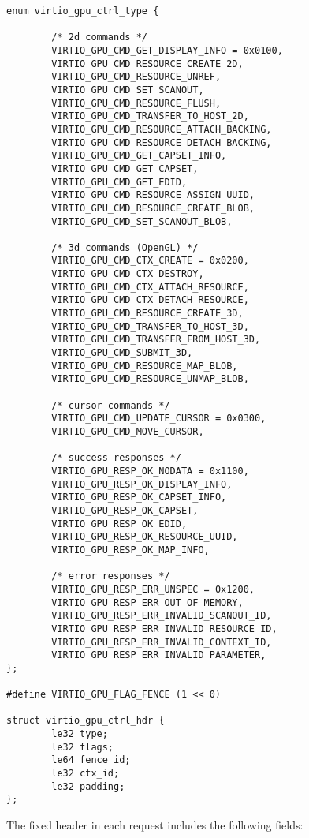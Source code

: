 \begin{lstlisting}
enum virtio_gpu_ctrl_type {

        /* 2d commands */
        VIRTIO_GPU_CMD_GET_DISPLAY_INFO = 0x0100,
        VIRTIO_GPU_CMD_RESOURCE_CREATE_2D,
        VIRTIO_GPU_CMD_RESOURCE_UNREF,
        VIRTIO_GPU_CMD_SET_SCANOUT,
        VIRTIO_GPU_CMD_RESOURCE_FLUSH,
        VIRTIO_GPU_CMD_TRANSFER_TO_HOST_2D,
        VIRTIO_GPU_CMD_RESOURCE_ATTACH_BACKING,
        VIRTIO_GPU_CMD_RESOURCE_DETACH_BACKING,
        VIRTIO_GPU_CMD_GET_CAPSET_INFO,
        VIRTIO_GPU_CMD_GET_CAPSET,
        VIRTIO_GPU_CMD_GET_EDID,
        VIRTIO_GPU_CMD_RESOURCE_ASSIGN_UUID,
        VIRTIO_GPU_CMD_RESOURCE_CREATE_BLOB,
        VIRTIO_GPU_CMD_SET_SCANOUT_BLOB,

        /* 3d commands (OpenGL) */
        VIRTIO_GPU_CMD_CTX_CREATE = 0x0200,
        VIRTIO_GPU_CMD_CTX_DESTROY,
        VIRTIO_GPU_CMD_CTX_ATTACH_RESOURCE,
        VIRTIO_GPU_CMD_CTX_DETACH_RESOURCE,
        VIRTIO_GPU_CMD_RESOURCE_CREATE_3D,
        VIRTIO_GPU_CMD_TRANSFER_TO_HOST_3D,
        VIRTIO_GPU_CMD_TRANSFER_FROM_HOST_3D,
        VIRTIO_GPU_CMD_SUBMIT_3D,
        VIRTIO_GPU_CMD_RESOURCE_MAP_BLOB,
        VIRTIO_GPU_CMD_RESOURCE_UNMAP_BLOB,

        /* cursor commands */
        VIRTIO_GPU_CMD_UPDATE_CURSOR = 0x0300,
        VIRTIO_GPU_CMD_MOVE_CURSOR,

        /* success responses */
        VIRTIO_GPU_RESP_OK_NODATA = 0x1100,
        VIRTIO_GPU_RESP_OK_DISPLAY_INFO,
        VIRTIO_GPU_RESP_OK_CAPSET_INFO,
        VIRTIO_GPU_RESP_OK_CAPSET,
        VIRTIO_GPU_RESP_OK_EDID,
        VIRTIO_GPU_RESP_OK_RESOURCE_UUID,
        VIRTIO_GPU_RESP_OK_MAP_INFO,

        /* error responses */
        VIRTIO_GPU_RESP_ERR_UNSPEC = 0x1200,
        VIRTIO_GPU_RESP_ERR_OUT_OF_MEMORY,
        VIRTIO_GPU_RESP_ERR_INVALID_SCANOUT_ID,
        VIRTIO_GPU_RESP_ERR_INVALID_RESOURCE_ID,
        VIRTIO_GPU_RESP_ERR_INVALID_CONTEXT_ID,
        VIRTIO_GPU_RESP_ERR_INVALID_PARAMETER,
};

#define VIRTIO_GPU_FLAG_FENCE (1 << 0)

struct virtio_gpu_ctrl_hdr {
        le32 type;
        le32 flags;
        le64 fence_id;
        le32 ctx_id;
        le32 padding;
};
\end{lstlisting}

The fixed header  in each
request includes the following fields:

